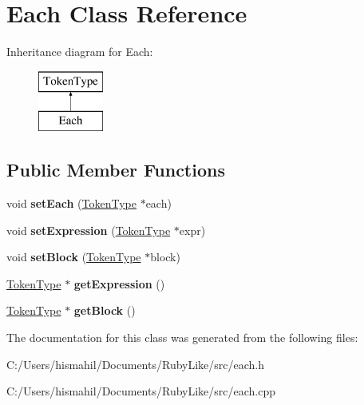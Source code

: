 \hypertarget{class_each}{\section{Each Class Reference}
\label{class_each}
}
Inheritance diagram for Each\-:\begin{figure}[H]
\begin{center}
\leavevmode
\includegraphics[height=2.000000cm]{class_each}
\end{center}
\end{figure}
\subsection*{Public Member Functions}
\begin{DoxyCompactItemize}
\item 
\hypertarget{class_each_afa02bf01ae863a66e04121ed9286ec92}{void {\bfseries set\-Each} (\hyperlink{class_token_type}{Token\-Type} $\ast$each)}\label{class_each_afa02bf01ae863a66e04121ed9286ec92}

\item 
\hypertarget{class_each_a38d48db85647d0c4bfd2b17508295dbe}{void {\bfseries set\-Expression} (\hyperlink{class_token_type}{Token\-Type} $\ast$expr)}\label{class_each_a38d48db85647d0c4bfd2b17508295dbe}

\item 
\hypertarget{class_each_aebb3578a7f206dca8cd132870d76e047}{void {\bfseries set\-Block} (\hyperlink{class_token_type}{Token\-Type} $\ast$block)}\label{class_each_aebb3578a7f206dca8cd132870d76e047}

\item 
\hypertarget{class_each_a32183537716a0503430edbc4be513286}{\hyperlink{class_token_type}{Token\-Type} $\ast$ {\bfseries get\-Expression} ()}\label{class_each_a32183537716a0503430edbc4be513286}

\item 
\hypertarget{class_each_ae1d5bcf365215c324c6f876826da0ac4}{\hyperlink{class_token_type}{Token\-Type} $\ast$ {\bfseries get\-Block} ()}\label{class_each_ae1d5bcf365215c324c6f876826da0ac4}

\end{DoxyCompactItemize}


The documentation for this class was generated from the following files\-:\begin{DoxyCompactItemize}
\item 
C\-:/\-Users/hismahil/\-Documents/\-Ruby\-Like/src/each.\-h\item 
C\-:/\-Users/hismahil/\-Documents/\-Ruby\-Like/src/each.\-cpp\end{DoxyCompactItemize}
